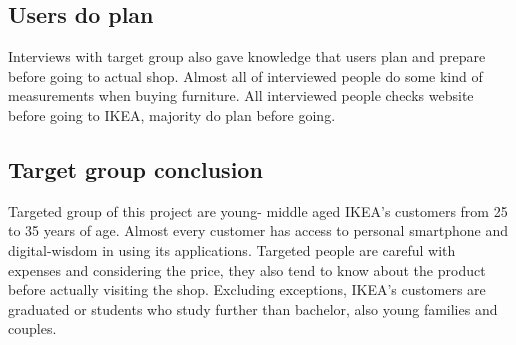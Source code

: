 \subsection{Users do plan}
Interviews with target group also gave knowledge that users plan and prepare before going to actual shop. Almost all of interviewed people do some kind of measurements when buying furniture. All interviewed people checks website before going to IKEA, majority do plan before going. 

\subsection{Target group conclusion}
Targeted group of this project are young- middle aged IKEA’s customers from 25 to 35 years of age. Almost every customer has access to personal smartphone and digital-wisdom in using its applications. Targeted people are careful with expenses and considering the price, they also tend to know about the product before actually visiting the shop. Excluding exceptions, IKEA’s customers are graduated or students who study further than bachelor, also young families and couples.



